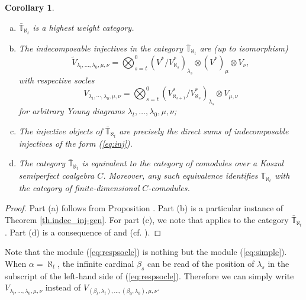 \documentclass[11pt]{article}
\theoremstyle{plain}
\newtheorem{corollary}[lemma]{Corollary}
\theoremstyle{nonumberplain}
\theoremstyle{plain}
\theoremstyle{nonumberplain}
\newtheorem{proof}{Proof}
\newcommand\bT{\mathbb T}
\newcommand\al{\aleph}
\begin{document}
\begin{corollary}\label{cor.bigone}
  \begin{enumerate}[(a)]
  	\item $\bar{\bT}_{\aleph_t}$ is a
  highest weight category.
  	\item The indecomposable injectives in the category $\bar{\bT}_{\al_t}$ are (up to isomorphism)
  \begin{equation}\label{eq:inj}
   \tilde{V}_{\lambda_t,\ldots,\lambda_0,\mu,\nu}=\bigotimes_{s=t}^0(V^*/V^*_{\al_s})_{\lambda_s} \otimes (V^*)_{\mu}\otimes V_{\nu},
  \end{equation}
with respective socles 
  \begin{equation}\label{eq:respsocle}
    V_{\lambda_t,\cdots,\lambda_0,\mu,\nu}=\bigotimes_{s=t}^0(V^*_{\al_{s+1}}/V^*_{\al_s})_{\lambda_s} \otimes V_{\mu,\nu}
  \end{equation}
   for arbitrary Young diagrams $\lambda_t,\ldots,\lambda_0,\mu,\nu$;
  \item The injective objects {of $\bar{\bT}_{\aleph_t}$} are precisely the direct sums
  of indecomposable injectives of the form (\ref{eq:inj}).
  
  \item The category $\overline{\bT}_{\aleph_t}$ is equivalent to {the category} of
  comodules over a Koszul semiperfect coalgebra $C$. Moreover, any
  such equivalence identifies $\bT_{\aleph_t}$ {with} the category of
  finite-dimensional $C$-comodules. 
  \end{enumerate}
\end{corollary}

\begin{proof}
	Part (a) follows from Proposition .  Part (b) is a particular instance of Theorem \ref{th.indec_inj-gen}.  For part (c), we note that   applies to the
  category $\bar{\bT}_{\aleph_t}$.  Part (d) is a consequence of  and
\cite[Theorem 2.13]{us2} (cf. \cite[Corollary 3.17]{us2}).
\end{proof}


Note that the module (\ref{eq:respsocle}) is nothing but the module (\ref{eq:simple}).  When $\alpha=\aleph_t$, the infinite cardinal $\beta_s$ can be read of the position of $\lambda_s$ in the subscript of the left-hand side of (\ref{eq:respsocle}).  Therefore we can simply write $V_{\lambda_t,\ldots,\lambda_0,\mu,\nu}$ instead of $V_{\left(\beta_t,\lambda_t\right),\ldots,\left(\beta_0,\lambda_0\right),\mu,\nu}$.
\end{document}

